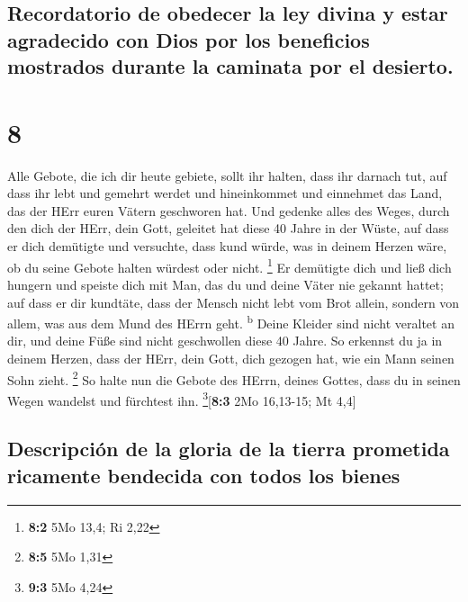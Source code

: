 \hypertarget{recordatorio-de-obedecer-la-ley-divina-y-estar-agradecido-con-dios-por-los-beneficios-mostrados-durante-la-caminata-por-el-desierto.}{%
\subsection{Recordatorio de obedecer la ley divina y estar agradecido
con Dios por los beneficios mostrados durante la caminata por el
desierto.}\label{recordatorio-de-obedecer-la-ley-divina-y-estar-agradecido-con-dios-por-los-beneficios-mostrados-durante-la-caminata-por-el-desierto.}}

\hypertarget{section-7}{%
\section{8}\label{section-7}}

 Alle Gebote, die ich dir heute gebiete, sollt ihr halten,
dass ihr darnach tut, auf dass ihr lebt und gemehrt werdet und
hineinkommet und einnehmet das Land, das der HErr euren Vätern
geschworen hat.  Und gedenke alles des Weges, durch den
dich der HErr, dein Gott, geleitet hat diese 40 Jahre in der Wüste, auf
dass er dich demütigte und versuchte, dass kund würde, was in deinem
Herzen wäre, ob du seine Gebote halten würdest oder nicht. \footnote{\textbf{8:2}
  5Mo 13,4; Ri 2,22}  Er demütigte dich und ließ dich
hungern und speiste dich mit Man, das du und deine Väter nie gekannt
hattet; auf dass er dir kundtäte, dass der Mensch nicht lebt vom Brot
allein, sondern von allem, was aus dem Mund des HErrn geht.
\textsuperscript{b}  Deine Kleider sind nicht veraltet an
dir, und deine Füße sind nicht geschwollen diese 40 Jahre.
 So erkennst du ja in deinem Herzen, dass der HErr, dein
Gott, dich gezogen hat, wie ein Mann seinen Sohn zieht. \footnote{\textbf{8:5}
  5Mo 1,31}  So halte nun die Gebote des HErrn, deines
Gottes, dass du in seinen Wegen wandelst und fürchtest ihn.
\footnote{\textbf{9:3} 5Mo 4,24}{[}\textbf{8:3} 2Mo 16,13-15; Mt 4,4{]}

\hypertarget{descripciuxf3n-de-la-gloria-de-la-tierra-prometida-ricamente-bendecida-con-todos-los-bienes}{%
\subsection{Descripción de la gloria de la tierra prometida ricamente
bendecida con todos los
bienes}\label{descripciuxf3n-de-la-gloria-de-la-tierra-prometida-ricamente-bendecida-con-todos-los-bienes}}


